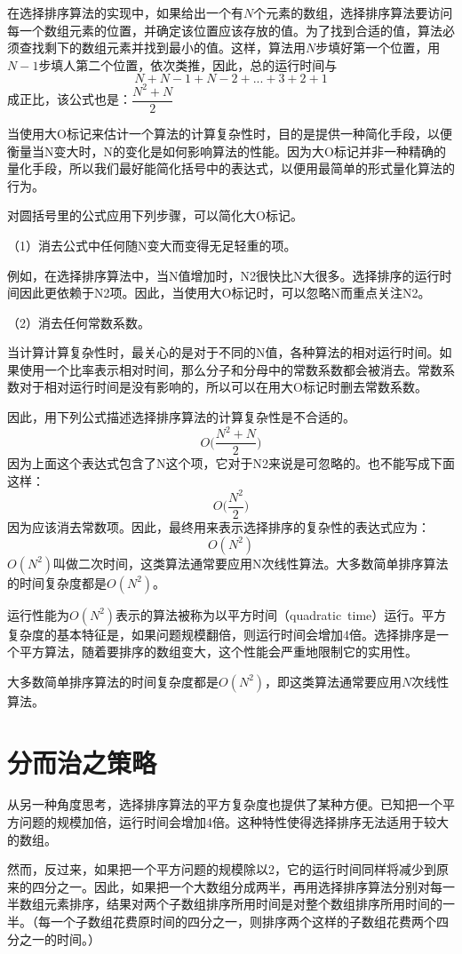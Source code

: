 在选择排序算法的实现中，如果给出一个有$N$个元素的数组，选择排序算法要访问每一个数组元素的位置，并确定该位置应该存放的值。为了找到合适的值，算法必须查找剩下的数组元素并找到最小的值。这样，算法用$N$步填好第一个位置，用$N-1$步填人第二个位置，依次类推，因此，总的运行时间与
\[N + N-1 + N-2 + ... + 3 + 2 + 1\]
成正比，该公式也是：$\dfrac{N^2+N}{2}$

当使用大O标记来估计一个算法的计算复杂性时，目的是提供一种简化手段，以便衡量当N变大时，N的变化是如何影响算法的性能。因为大O标记并非一种精确的量化手段，所以我们最好能简化括号中的表达式，以便用最简单的形式量化算法的行为。

对圆括号里的公式应用下列步骤，可以简化大O标记。

（1）消去公式中任何随N变大而变得无足轻重的项。

例如，在选择排序算法中，当N值增加时，N2很快比N大很多。选择排序的运行时间因此更依赖于N2项。因此，当使用大O标记时，可以忽略N而重点关注N2。

（2）消去任何常数系数。

当计算计算复杂性时，最关心的是对于不同的N值，各种算法的相对运行时间。如果使用一个比率表示相对时间，那么分子和分母中的常数系数都会被消去。常数系数对于相对运行时间是没有影响的，所以可以在用大O标记时删去常数系数。

因此，用下列公式描述选择排序算法的计算复杂性是不合适的。
\[O\bigg(\dfrac{N^2+N}{2} \bigg)\]
因为上面这个表达式包含了N这个项，它对于N2来说是可忽略的。也不能写成下面这样：
\[O\bigg(\dfrac{N^2}{2} \bigg)\]
因为应该消去常数项。因此，最终用来表示选择排序的复杂性的表达式应为：
\[O(N^2)\]
$O(N^2)$叫做二次时间，这类算法通常要应用N次线性算法。大多数简单排序算法的时间复杂度都是$O(N^2)$。

运行性能为$O(N^2)$表示的算法被称为以平方时间（quadratic~time）运行。平方复杂度的基本特征是，如果问题规模翻倍，则运行时间会增加4倍。选择排序是一个平方算法，随着要排序的数组变大，这个性能会严重地限制它的实用性。

大多数简单排序算法的时间复杂度都是$O(N^2)$，即这类算法通常要应用$N$次线性算法。

\section{分而治之策略}

从另一种角度思考，选择排序算法的平方复杂度也提供了某种方便。已知把一个平方问题的规模加倍，运行时间会增加4倍。这种特性使得选择排序无法适用于较大的数组。

然而，反过来，如果把一个平方问题的规模除以2，它的运行时间同样将减少到原来的四分之一。因此，如果把一个大数组分成两半，再用选择排序算法分别对每一半数组元素排序，结果对两个子数组排序所用时间是对整个数组排序所用时间的一半。（每一个子数组花费原时间的四分之一，则排序两个这样的子数组花费两个四分之一的时间。）


